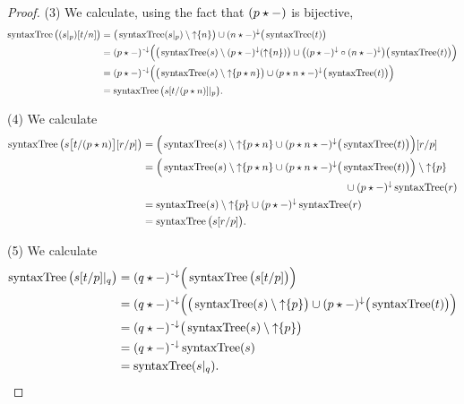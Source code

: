 \begin{proof}
(3) We calculate, using the fact that $(p\star -)$ is bijective,
\begin{align*}
\operatorname{syntaxTree}\big((s|_p)[t/n]\big) &= \big(\operatorname{syntaxTree}(s|_p) \setminus \operatorname{\uparrow}\{n\}\big) \cup (n\star -)^{\downarrow}\big(\operatorname{syntaxTree}(t)\big) \\
&= (p\star -)^{\text{\hspace{0.15em}-}\downarrow}\Big(\big(\operatorname{syntaxTree}(s) \setminus (p\star -)^\downarrow(\operatorname{\uparrow}\{n\})\big) \cup \big((p\star -)^{\downarrow}\circ(n\star -)^{\downarrow}\big)\big(\operatorname{syntaxTree}(t)\big)\Big) \\
&= (p\star -)^{\text{\hspace{0.15em}-}\downarrow}\Big(\big(\operatorname{syntaxTree}(s) \setminus \operatorname{\uparrow}\{p\star n\}\big) \cup (p\star n\star -)^{\downarrow}\big(\operatorname{syntaxTree}(t)\big)\Big) \\
&= \operatorname{syntaxTree}\big(s[t/(p\star n)]|_p\big).
\end{align*}

(4) We calculate
\begin{align*}
\syntaxTree\big(s\big[t/(p\concat n)\big][r/p]\big) &= \Big(\syntaxTree(s)\setminus\upset\{p\concat n\} \cup (p \concat n \concat -)^\imf\big(\syntaxTree(t)\big)\Big)[r/p] \\
&= \begin{multlined}[t]\Big(\syntaxTree(s)\setminus\upset\{p\concat n\} \cup (p \concat n \concat -)^\imf\big(\syntaxTree(t)\big)\Big)\setminus \upset\{p\} \\ \cup (p\concat -)^\imf\syntaxTree(r) \end{multlined} \\
&= \syntaxTree(s)\setminus\upset\{p\} \cup (p\concat -)^\imf\syntaxTree(r) \\
&= \syntaxTree\big(s[r/p]\big).
\end{align*}

(5) We calculate
\begin{align*}
\operatorname{syntaxTree}\big(s[t/p]|_q\big) &= (q\star -)^{{\text{\hspace{0.15em}-}\downarrow}}\Big(\operatorname{syntaxTree}\big(s[t/p]\big)\Big) \\
&= (q\star -)^{{\text{\hspace{0.15em}-}\downarrow}}\Big(\big(\operatorname{syntaxTree}(s)\setminus\operatorname{\uparrow}\{p\}\big) \cup (p\star -)^\downarrow\big(\operatorname{syntaxTree}(t)\big)\Big) \\
&= (q\star -)^{{\text{\hspace{0.15em}-}\downarrow}}\big(\operatorname{syntaxTree}(s)\setminus\operatorname{\uparrow}\{p\}\big) \\
&= (q\star -)^{{\text{\hspace{0.15em}-}\downarrow}}\operatorname{syntaxTree}(s) \\
&=\operatorname{syntaxTree}(s|_q).
\end{align*}


\end{proof}
